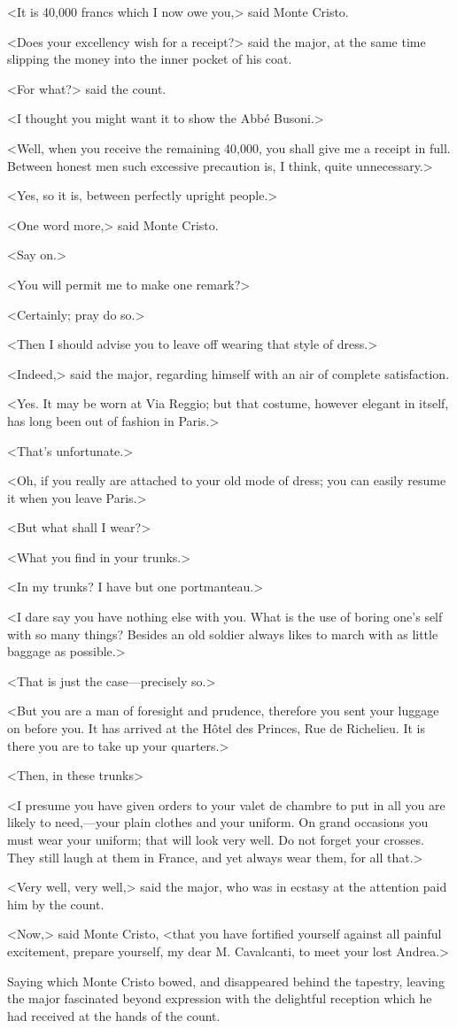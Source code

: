  <It is 40,000 francs which I now owe you,> said Monte Cristo. 

 <Does your excellency wish for a receipt?> said the major, at the same time slipping the money into the inner pocket of his coat. 

 <For what?> said the count. 

 <I thought you might want it to show the Abbé Busoni.> 

 <Well, when you receive the remaining 40,000, you shall give me a receipt in full. Between honest men such excessive precaution is, I think, quite unnecessary.> 

 <Yes, so it is, between perfectly upright people.> 

 <One word more,> said Monte Cristo. 

 <Say on.> 

 <You will permit me to make one remark?> 

 <Certainly; pray do so.> 

 <Then I should advise you to leave off wearing that style of dress.> 

 <Indeed,> said the major, regarding himself with an air of complete satisfaction. 

 <Yes. It may be worn at Via Reggio; but that costume, however elegant in itself, has long been out of fashion in Paris.> 

 <That's unfortunate.> 

 <Oh, if you really are attached to your old mode of dress; you can easily resume it when you leave Paris.> 

 <But what shall I wear?> 

 <What you find in your trunks.> 

 <In my trunks? I have but one portmanteau.> 

 <I dare say you have nothing else with you. What is the use of boring one's self with so many things? Besides an old soldier always likes to march with as little baggage as possible.> 

 <That is just the case—precisely so.> 

 <But you are a man of foresight and prudence, therefore you sent your luggage on before you. It has arrived at the Hôtel des Princes, Rue de Richelieu. It is there you are to take up your quarters.> 

 <Then, in these trunks\longdash> 

 <I presume you have given orders to your valet de chambre to put in all you are likely to need,—your plain clothes and your uniform. On grand occasions you must wear your uniform; that will look very well. Do not forget your crosses. They still laugh at them in France, and yet always wear them, for all that.> 

 <Very well, very well,> said the major, who was in ecstasy at the attention paid him by the count. 

 <Now,> said Monte Cristo, <that you have fortified yourself against all painful excitement, prepare yourself, my dear M. Cavalcanti, to meet your lost Andrea.> 

 Saying which Monte Cristo bowed, and disappeared behind the tapestry, leaving the major fascinated beyond expression with the delightful reception which he had received at the hands of the count. 